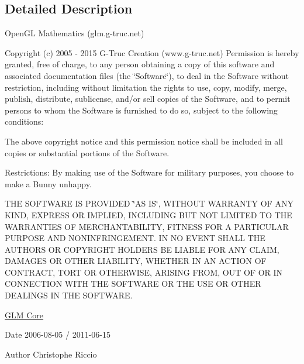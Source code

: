 \subsection{Detailed Description}
Open\-G\-L Mathematics (glm.\-g-\/truc.\-net)

Copyright (c) 2005 -\/ 2015 G-\/\-Truc Creation (www.\-g-\/truc.\-net) Permission is hereby granted, free of charge, to any person obtaining a copy of this software and associated documentation files (the \char`\"{}\-Software\char`\"{}), to deal in the Software without restriction, including without limitation the rights to use, copy, modify, merge, publish, distribute, sublicense, and/or sell copies of the Software, and to permit persons to whom the Software is furnished to do so, subject to the following conditions\-:

The above copyright notice and this permission notice shall be included in all copies or substantial portions of the Software.

Restrictions\-: By making use of the Software for military purposes, you choose to make a Bunny unhappy.

T\-H\-E S\-O\-F\-T\-W\-A\-R\-E I\-S P\-R\-O\-V\-I\-D\-E\-D \char`\"{}\-A\-S I\-S\char`\"{}, W\-I\-T\-H\-O\-U\-T W\-A\-R\-R\-A\-N\-T\-Y O\-F A\-N\-Y K\-I\-N\-D, E\-X\-P\-R\-E\-S\-S O\-R I\-M\-P\-L\-I\-E\-D, I\-N\-C\-L\-U\-D\-I\-N\-G B\-U\-T N\-O\-T L\-I\-M\-I\-T\-E\-D T\-O T\-H\-E W\-A\-R\-R\-A\-N\-T\-I\-E\-S O\-F M\-E\-R\-C\-H\-A\-N\-T\-A\-B\-I\-L\-I\-T\-Y, F\-I\-T\-N\-E\-S\-S F\-O\-R A P\-A\-R\-T\-I\-C\-U\-L\-A\-R P\-U\-R\-P\-O\-S\-E A\-N\-D N\-O\-N\-I\-N\-F\-R\-I\-N\-G\-E\-M\-E\-N\-T. I\-N N\-O E\-V\-E\-N\-T S\-H\-A\-L\-L T\-H\-E A\-U\-T\-H\-O\-R\-S O\-R C\-O\-P\-Y\-R\-I\-G\-H\-T H\-O\-L\-D\-E\-R\-S B\-E L\-I\-A\-B\-L\-E F\-O\-R A\-N\-Y C\-L\-A\-I\-M, D\-A\-M\-A\-G\-E\-S O\-R O\-T\-H\-E\-R L\-I\-A\-B\-I\-L\-I\-T\-Y, W\-H\-E\-T\-H\-E\-R I\-N A\-N A\-C\-T\-I\-O\-N O\-F C\-O\-N\-T\-R\-A\-C\-T, T\-O\-R\-T O\-R O\-T\-H\-E\-R\-W\-I\-S\-E, A\-R\-I\-S\-I\-N\-G F\-R\-O\-M, O\-U\-T O\-F O\-R I\-N C\-O\-N\-N\-E\-C\-T\-I\-O\-N W\-I\-T\-H T\-H\-E S\-O\-F\-T\-W\-A\-R\-E O\-R T\-H\-E U\-S\-E O\-R O\-T\-H\-E\-R D\-E\-A\-L\-I\-N\-G\-S I\-N T\-H\-E S\-O\-F\-T\-W\-A\-R\-E.

\hyperlink{group__core}{G\-L\-M Core}

\begin{DoxyDate}{Date}
2006-\/08-\/05 / 2011-\/06-\/15 
\end{DoxyDate}
\begin{DoxyAuthor}{Author}
Christophe Riccio 
\end{DoxyAuthor}
